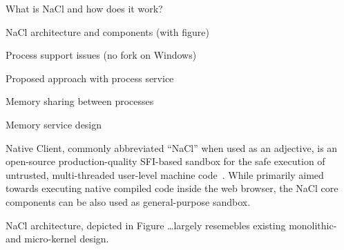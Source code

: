 \begin{structure}
  \item What is NaCl and how does it work?
  \item NaCl architecture and components (with figure)
  \item Process support issues (\eg no fork on Windows)
  \item Proposed approach with process service
  \item Memory sharing between processes
  \item Memory service design
\end{structure}

Native Client, commonly abbreviated ``NaCl'' when used as an adjective,
is an open-source production-quality SFI-based sandbox for the safe
execution of untrusted, multi-threaded user-level machine
code~\cite{yee:ieee-sp09,sehr:usenix-sec10,ansel:pldi11}. While
primarily aimed towards executing native compiled code inside the web
browser, the NaCl core components can be also used as
general-purpose sandbox.

NaCl architecture, depicted in Figure \ldots largely resemebles
existing monolithic- and micro-kernel design.
